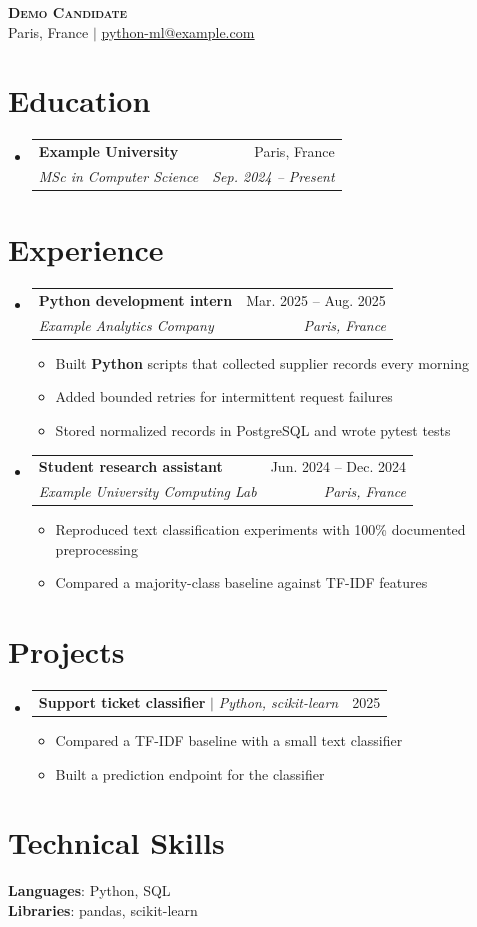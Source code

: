 \documentclass[letterpaper,11pt]{article}
\makeatletter
\newcommand{\resumeItem}[1]{
  \item\small{#1 \vspace{-2pt}}
}
\newcommand{\resumeSubheading}[4]{
  \vspace{-2pt}\item
  \begin{tabularx}{0.97\textwidth}[t]{@{}X r@{}}
    \textbf{#1} & #2 \\
    \textit{\small#3} & \textit{\small#4} \\
  \end{tabularx}\vspace{-7pt}
}
\newcommand{\resumeProjectHeading}[2]{
  \item
  \begin{tabularx}{0.97\textwidth}{@{}X r@{}}
    \small#1 & #2 \\
  \end{tabularx}\vspace{-7pt}
}
\newcommand{\resumeSubHeadingListStart}{
  \begin{itemize}[leftmargin=0.15in, label={}]
}
\newcommand{\resumeSubHeadingListEnd}{\end{itemize}}
\newcommand{\resumeItemListStart}{\begin{itemize}}
\newcommand{\resumeItemListEnd}{\end{itemize}\vspace{-5pt}}
\makeatother
\begin{document}
\begin{center}
  \textbf{\Huge \scshape Demo Candidate} \\ \vspace{1pt}
  \small Paris, France $|$ \href{mailto:python-ml@example.com}{\underline{python-ml@example.com}}
\end{center}

\section{Education}
  \resumeSubHeadingListStart
    \resumeSubheading
      {Example University}{Paris, France}
      {MSc in Computer Science}{Sep. 2024 -- Present}
  \resumeSubHeadingListEnd

\section{Experience}
  \resumeSubHeadingListStart
    \resumeSubheading
      {Python development intern}{Mar. 2025 -- Aug. 2025}
      {Example Analytics Company}{Paris, France}
      \resumeItemListStart
        \resumeItem{Built \textbf{Python} scripts that collected supplier records every morning}
        \resumeItem{Added bounded retries for intermittent request failures}
        \resumeItem{Stored normalized records in PostgreSQL and wrote pytest tests}
      \resumeItemListEnd

    \resumeSubheading
      {Student research assistant}{Jun. 2024 -- Dec. 2024}
      {Example University Computing Lab}{Paris, France}
      \resumeItemListStart
        \resumeItem{Reproduced text classification experiments with 100\% documented preprocessing}
        \resumeItem{Compared a majority-class baseline against TF-IDF features}
      \resumeItemListEnd
  \resumeSubHeadingListEnd

\section{Projects}
    \resumeSubHeadingListStart
      \resumeProjectHeading
          {\textbf{Support ticket classifier} $|$ \emph{Python, scikit-learn}}{2025}
          \resumeItemListStart
            \resumeItem{Compared a TF-IDF baseline with a small text classifier}
            \resumeItem{Built a prediction endpoint for the classifier}
          \resumeItemListEnd
    \resumeSubHeadingListEnd


\section{Technical Skills}
 \begin{itemize}[leftmargin=0.15in, label={}]
    \small{\item{
     \textbf{Languages}{: Python, SQL} \\
     \textbf{Libraries}{: pandas, scikit-learn} \\
    }}
 \end{itemize}
\end{document}
